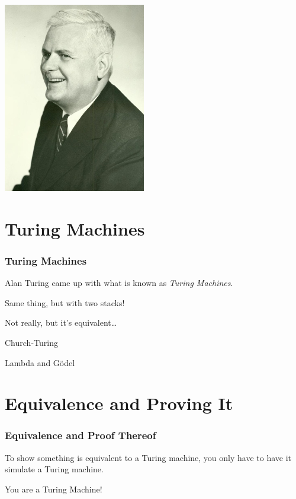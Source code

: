 \documentclass[mathserif]{beamer}
\begin{document}
\begin{frame}
\begin{multicols}{2}
    \includegraphics[width=0.9\linewidth]{media/church.jpg}
  \end{multicols}
\end{frame}

\section{Turing Machines}
\begin{frame}
  \frametitle{Turing Machines}

  Alan Turing came up with what is known as \emph{Turing Machines}.

  Same thing, but with two stacks!

  Not really, but it's equivalent\ldots

  Church-Turing

  Lambda and G\"odel

\end{frame}

\section{Equivalence and Proving It}
\begin{frame}
  \frametitle{Equivalence and Proof Thereof}

  \begin{center}
    To show something is equivalent to a Turing machine, you only have to
    have it simulate a Turing machine.

    \vspace{10mm}

    \Large You are a Turing Machine!
  \end{center}
\end{frame}
\end{document}

